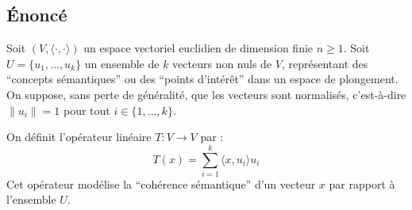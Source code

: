 \documentclass[11pt,a4paper]{report}
\begin{document}
\hypertarget{uxe9noncuxe9}{%
\subsection{Énoncé}\label{uxe9noncuxe9}}

Soit \((V, \langle \cdot, \cdot \rangle)\) un espace vectoriel euclidien
de dimension finie \(n \ge 1\). Soit \(U = \{u_1, \dots, u_k\}\) un
ensemble de \(k\) vecteurs non nuls de \(V\), représentant des
``concepts sémantiques'' ou des ``points d'intérêt'' dans un espace de
plongement. On suppose, sans perte de généralité, que les vecteurs sont
normalisés, c'est-à-dire \(\|u_i\| = 1\) pour tout
\(i \in \{1, \dots, k\}\).

On définit l'opérateur linéaire \(T: V \to V\) par :
\[ T(x) = \sum_{i=1}^k \langle x, u_i \rangle u_i \] Cet opérateur
modélise la ``cohérence sémantique'' d'un vecteur \(x\) par rapport à
l'ensemble \(U\).
\end{document}
